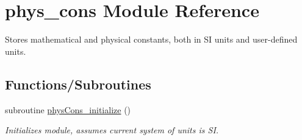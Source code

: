 \hypertarget{namespacephys__cons}{
\section{phys\_\-cons Module Reference}
\label{namespacephys__cons}
}


Stores mathematical and physical constants, both in SI units and user-\/defined units.  


\subsection*{Functions/Subroutines}
\begin{DoxyCompactItemize}
\item 
subroutine \hyperlink{namespacephys__cons_a8ef21bd0854146018406be9f1aee9921}{physCons\_\-initialize} ()
\begin{DoxyCompactList}\small\item\em Initializes module, assumes current system of units is SI. \item\end{DoxyCompactList}\end{DoxyCompactItemize}
